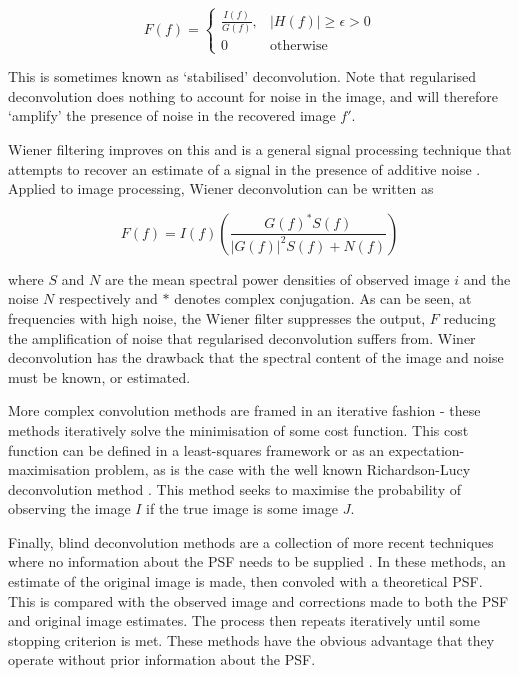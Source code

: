 \begin{equation}
\label{eq:regularised_deconvolution}
F(f) = \begin{cases}
	\frac{I(f)}{G(f)},	& \left| H(f) \right| \ge \epsilon> 0 \\
	0					& \text{otherwise}
\end{cases}
\end{equation}

This is sometimes known as \enquote*{stabilised} deconvolution.
Note that regularised deconvolution does nothing to account for noise in the image, and will therefore \enquote*{amplify} the presence of noise in the recovered image $f'$.

Wiener filtering improves on this and is a general signal processing technique that attempts to recover an estimate of a signal in the presence of additive noise \cite{wiener1964extrapolation}.
Applied to image processing, Wiener deconvolution can be written as

\begin{equation}
\label{eq:wiener_filter}
F(f) = I(f) \left( \frac{G(f)^* S(f)}{\left| G(f) \right|^2 S(f) + N(f) } \right)
\end{equation}

where $S$ and $N$ are the mean spectral power densities of observed image $i$ and the noise $N$ respectively and $*$ denotes complex conjugation.
As can be seen, at frequencies with high noise, the Wiener filter suppresses the output, $F$ reducing the amplification of noise that regularised deconvolution suffers from.
Winer deconvolution has the drawback that the spectral content of the image and noise must be known, or estimated.

More complex convolution methods are framed in an iterative fashion - these methods iteratively solve the minimisation of some cost function.
This cost function can be defined in a least-squares framework \cite{ng99anew} or as an expectation-maximisation problem, as is the case with the well known Richardson-Lucy deconvolution method \cite{richarson1972bayesian}.
This method seeks to maximise the probability of observing the image $I$ if the true image is some image $J$.

Finally, blind deconvolution methods are a collection of more recent techniques where no information about the PSF needs to be supplied \cite{bell1995information, ayers1988iterative}.
In these methods, an estimate of the original image is made, then convoled with a theoretical PSF.
This is compared with the observed image and corrections made to both the PSF and original image estimates.
The process then repeats iteratively until some stopping criterion is met.
These methods have the obvious advantage that they operate without prior information about the PSF.

